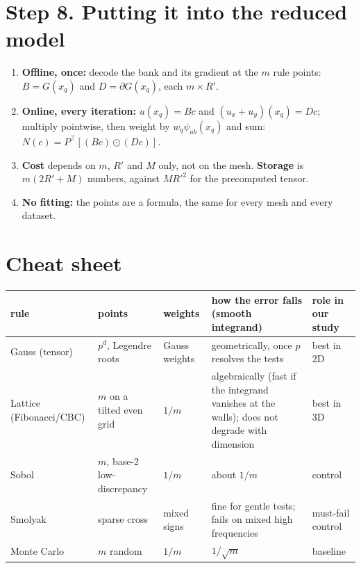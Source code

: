 \documentclass[11pt]{article}
\begin{document}
\section*{Step 8. Putting it into the reduced model}
\begin{enumerate}
\item \textbf{Offline, once:} decode the bank and its gradient at the $m$ rule points: $B=G(x_q)$ and $D=\partial G(x_q)$,
each $m\times R'$.
\item \textbf{Online, every iteration:} $u(x_q)=Bc$ and $(u_x+u_y)(x_q)=Dc$; multiply pointwise, then weight by
$w_q\psi_{ab}(x_q)$ and sum: $N(c)=P^\top[(Bc)\odot(Dc)]$.
\item \textbf{Cost} depends on $m$, $R'$ and $M$ only, not on the mesh. \textbf{Storage} is $m(2R'+M)$ numbers, against
$MR'^2$ for the precomputed tensor.
\item \textbf{No fitting:} the points are a formula, the same for every mesh and every dataset.
\end{enumerate}

\section*{Cheat sheet}
\small
\begin{tabularx}{\linewidth}{@{}l X X X l@{}}
\toprule
rule & points & weights & how the error falls (smooth integrand) & role in our study\\
\midrule
Gauss (tensor) & $p^d$, Legendre roots & Gauss weights & geometrically, once $p$ resolves the tests & best in 2D\\
Lattice (Fibonacci/CBC) & $m$ on a tilted even grid & $1/m$ & algebraically (fast if the integrand vanishes at the walls); does not degrade with dimension & best in 3D\\
Sobol & $m$, base-2 low-discrepancy & $1/m$ & about $1/m$ & control\\
Smolyak & sparse cross & mixed signs & fine for gentle tests; fails on mixed high frequencies & must-fail control\\
Monte Carlo & $m$ random & $1/m$ & $1/\sqrt m$ & baseline\\
\bottomrule
\end{tabularx}
\normalsize
\end{document}
